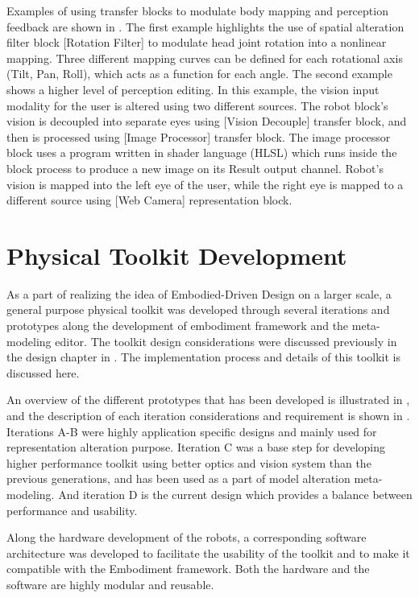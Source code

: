 Examples of using transfer blocks to modulate body mapping and perception feedback are shown in . The first example highlights the use of spatial alteration filter block [Rotation Filter] to modulate head joint rotation into a nonlinear mapping. Three different mapping curves can be defined for each rotational axis (Tilt, Pan, Roll), which acts as a function for each angle. The second example shows a higher level of perception editing. In this example, the vision input modality for the user is altered using two different sources. The robot block's vision is decoupled into separate eyes using [Vision Decouple] transfer block, and then is processed using [Image Processor] transfer block. The image processor block uses a program written in shader language (HLSL) which runs inside the block process to produce a new image on its Result output channel. Robot's vision is mapped into the left eye of the user, while the right eye is mapped to a different source using [Web Camera] representation block. 



\section{Physical Toolkit Development}
\label{impl:toolkit}

As a part of realizing the idea of Embodied-Driven Design on a larger scale, a general purpose physical toolkit was developed through several iterations and prototypes along the development of embodiment framework and the meta-modeling editor. The toolkit design considerations were discussed previously in the design chapter in . The implementation process and details of this toolkit is discussed here.

An overview of the different prototypes that has been developed is illustrated in , and the description of each iteration considerations and requirement is shown in . Iterations A-B were highly application specific designs and mainly used for representation alteration purpose. Iteration C was a base step for developing higher performance toolkit using better optics and vision system than the previous generations, and has been used as a part of model alteration meta-modeling. And iteration D is the current design which provides a balance between performance and usability. 

Along the hardware development of the robots, a corresponding software architecture was developed to facilitate the usability of the toolkit and to make it compatible with the Embodiment framework. Both the hardware and the software are highly modular and reusable. 

